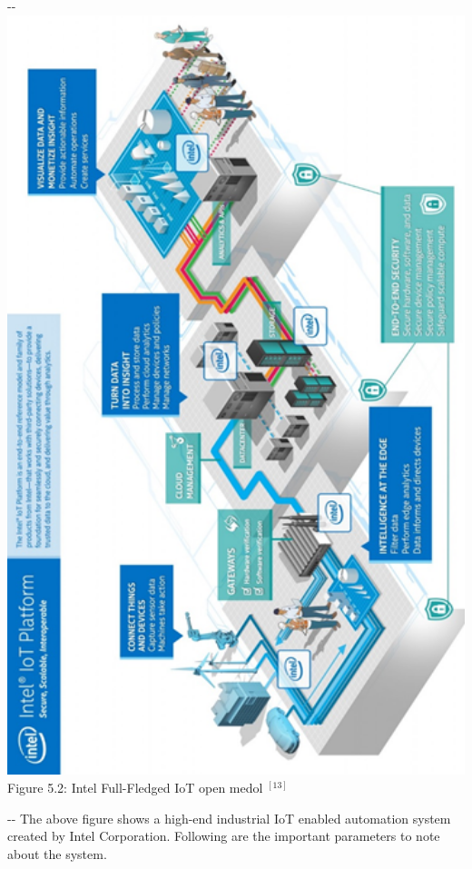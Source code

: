 \documentclass[12pt]{article}
\makeatletter
\newenvironment{indentation}[3]%
	{\par\setlength{\parindent}{#3}
	\setlength{\leftmargin}{#1}       \setlength{\rightmargin}{#2}%
	\advance\linewidth -\leftmargin       \advance\linewidth -\rightmargin%
	\advance\@totalleftmargin\leftmargin  \@setpar{{\@@par}}%
	\parshape 1\@totalleftmargin \linewidth\ignorespaces}{\par}%
\makeatother
\begin{document}
\begin{center}
\begin{indentation}{0pt}{0pt}{0pt}
\includegraphics[width=451pt]{img-8.png} Figure 5.2: Intel Full-Fledged IoT open
medol 
$^{[13]}$

\end{indentation}
\end{center}

\begin{indentation}{0pt}{0pt}{0pt}
The above figure shows a high-end industrial IoT enabled automation system
created by Intel Corporation. Following are the important parameters to note
about the system.
\end{indentation}
\end{document}
